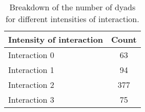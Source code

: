 \begin{table}
\centering
\caption{Breakdown of the number of dyads for different intensities of interaction.}
\label{tab:counts_dyads_interaction}
\begin{tabular}{lc}
\toprule
Intensity of interaction & Count \\
\midrule
Interaction 0 & 63 \\
Interaction 1 & 94 \\
Interaction 2 & 377 \\
Interaction 3 & 75 \\
\bottomrule
\end{tabular}
\end{table}
